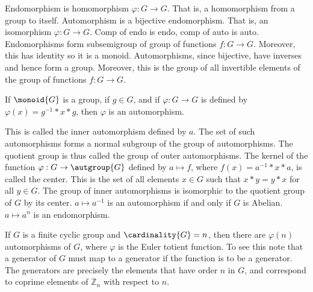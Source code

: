 \documentclass{article}                                                        %
\begin{document}
                Endomorphism is homomorphism $\varphi:G\rightarrow{G}$. That is,
                a homomorphism from a group to itself. Automorphism is a
                bijective endomorphism. That is, an isomorphism
                $\varphi:G\rightarrow{G}$. Comp of endo is endo, comp of auto is
                auto. Endomorphisms form subsemigroup of group of functions
                $f:G\rightarrow{G}$. Moreover, this has identity so it is a
                monoid. Automorphisms, since bijective, have inverses and hence
                form a group. Moreover, this is the group of all invertible
                elements of the group of functions $f:G\rightarrow{G}$.
                \begin{theorem}
                    If $\monoid{G}$ is a group, if $g\in{G}$, and if
                    $\varphi:G\rightarrow{G}$ is defined by
                    $\varphi(x)=g^{\minus{1}}*x*g$, then $\varphi$ is an
                    automorphism.
                \end{theorem}
                This is called the inner automorphism defined by $a$. The set
                of such automorphisms forms a normal subgroup of the group of
                automorphisms. The quotient group is thus called the group of
                outer automorphisms. The kernel of the function
                $\varphi:G\rightarrow\autgroup{G}$ defined by
                $a\mapsto{f}$, where $f(x)=a^{\minus{1}}*x*a$, is called the
                center. This is the set of all elements $x\in{G}$ such that
                $x*y=y*x$ for all $y\in{G}$. The group of inner automorphisms is
                isomorphic to the quotient group of $G$ by its center.
                $a\mapsto{a}^{\minus{1}}$ is an automorphism if and only if
                $G$ is Abelian. $a\mapsto{a}^{n}$ is an endomorphism.
                \begin{example}
                    If $G$ is a finite cyclic group and $\cardinality{G}=n$,
                    then there are $\varphi(n)$ automorphisms of $G$, where
                    $\varphi$ is the Euler totient function. To see this note
                    that a generator of $G$ must map to a generator if the
                    function is to be a generator. The generators are precisely
                    the elements that have order $n$ in $G$, and correspond to
                    coprime elements of $\mathbb{Z}_{n}$ with respect to $n$.
                \end{example}
\end{document}
